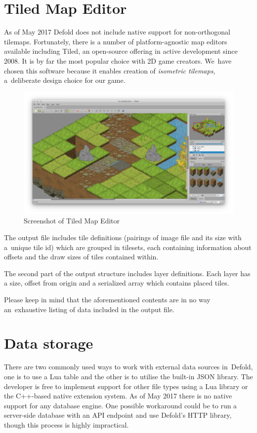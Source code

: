 \documentclass[thesis=B,english,hidelinks]{FITthesisXE}[2012/06/26]
\begin{document}
\section{Tiled Map Editor}

As of May 2017 Defold does not include native support for non-orthogonal tilemaps. Fortunately, there is a number of platform-agnostic map editors available including Tiled\autocite{tiled}, an open-source offering in active development since 2008. It is by far the most popular choice with 2D game creators. We~have chosen this software because it enables creation of \emph{isometric tilemaps}, a~deliberate design choice for our game.

\begin{figure}[ht]
\centering
\includegraphics[scale=0.2]{tiled}
\caption{Screenshot of Tiled Map Editor}
\label{fig:tiled}
\end{figure}

The output file includes tile definitions (pairings of image file and its size with a~unique tile id) which are grouped in tilesets, each containing information about offsets and the draw sizes of tiles contained within.

The second part of the output structure includes layer definitions. Each layer has a size, offset from origin and a serialized array which contains placed tiles.

Please keep in mind that the aforementioned contents are in no way an~exhaustive listing of data included in the output file.

\section{Data storage}

There are two commonly used ways to work with external data sources in~Defold, one is to use a Lua table and the other is to utilise the built-in JSON library\autocite{jsonlib}. The developer is free to implement support for other file types using a Lua library or the C++-based native extension system\autocite{nativeext}. As of May 2017 there is no native support for any database engine. One possible workaround could be to run a server-side database with an API endpoint and use Defold's HTTP library\autocite{httplib}, though this process is highly impractical.
\end{document}
